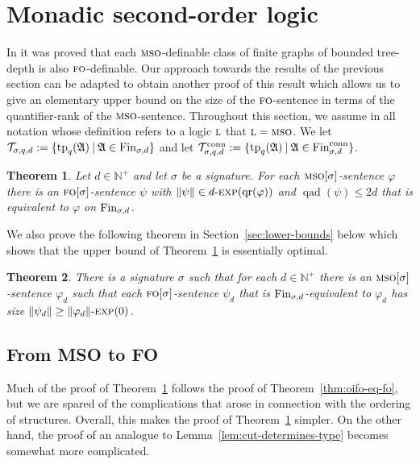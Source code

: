 \documentclass[11pt]{article}
\newtheorem{theorem}{Theorem}
\renewcommand{\phi}{\varphi}
\newcommand{\fin}{\textup{Fin}}
\newcommand{\conn}{\text{conn}}
\newcommand{\logic}[1]{\textsc{#1}}
\newcommand{\logl}{\logic{l}}
\newcommand{\FO}{\logic{fo}}
\newcommand{\MSO}{\logic{mso}}
\newcommand{\types}[1][\sigma,q,d]{\mathcal{T}_{#1}}
\newcommand{\ctypes}[1][\sigma,q,d]{\mathcal{T}^{\conn}_{#1}}
\newcommand{\size}[1]{\|#1\|}
\newcommand{\qr}[1]{\operatorname{qr}(#1)}
\newcommand{\qad}[1]{\operatorname{qad}(#1)}
\newcommand{\st}{\mathbin |}
\DeclareMathOperator{\tp}{tp}
\newcommand{\struct}[1]{\mathfrak{#1}}
\newcommand{\AS}{\struct{A}}
\newcommand{\setc}[2]{\{#1 \st #2\}}
\newcommand{\Npos}{\mathbb{N}^{+}}
\newcommand{\nexp}[1][d]{\ensuremath{#1\textnormal{-}\textsc{exp}}}
\begin{document}
\section{Monadic second-order logic}
\label{sec:mso}

In \cite{ElberfeldGT12} it was proved that each $\MSO{}$-definable class of
finite graphs of bounded tree-depth is also $\FO$-definable.  Our approach
towards the results of the previous section can be adapted to obtain another
proof of this result which allows us to give an elementary upper bound on the
size of the $\FO$-sentence in terms of the quantifier-rank of the
$\MSO{}$-sentence.  Throughout this section, we assume in all notation whose
definition refers to a logic $\logl$ that $\logl=\MSO{}$.  We let
$\types:=\setc{\tp_q(\AS)}{\AS\in\fin_{\sigma,d}}$ and let
$\ctypes:=\setc{\tp_q(\AS)}{\AS\in\fin^\conn_{\sigma,d}}$.

\begin{theorem}
  \label{thm:mso-eq-fo}
  Let $d\in \Npos$ and let $\sigma$ be a signature. For each
  $\MSO[\sigma]$-sentence $\phi$ there is an $\FO[\sigma]$-sen\-tence $\psi$ with
  $\size{\psi}\in \nexp[d](\qr{\phi})$ and $\qad{\psi} \leq 2d$ that is equivalent
  to $\phi$ on $\fin_{\sigma,d}$.
\end{theorem}

We also prove the following theorem in Section~\ref{sec:lower-bounds} below
which shows that the upper bound of Theorem~\ref{thm:mso-eq-fo} is essentially
optimal.

\begin{theorem}
  \label{thm:mso-lower-bound}
  There is a signature $\sigma$ such that for each $d\in \Npos$ there is an
  $\MSO[\sigma]$-sentence $\phi_d$ such that each $\FO[\sigma]$-sentence $\psi_d$
  that is $\fin_{\sigma,d}$-equivalent to $\phi_d$ has size $\size{\psi_d} \geq
  \nexp[\size{\phi_d}](0)$.
\end{theorem}

\subsection{From MSO to FO}

Much of the proof of Theorem~\ref{thm:mso-eq-fo} follows the proof of
Theorem~\ref{thm:oifo-eq-fo}, but we are spared of the complications that arose
in connection with the ordering of structures.  Overall, this makes the proof of
Theorem~\ref{thm:mso-eq-fo} simpler.  On the other hand, the proof of an
analogue to Lemma~\ref{lem:cut-determines-type} becomes somewhat more
complicated.
\end{document}
